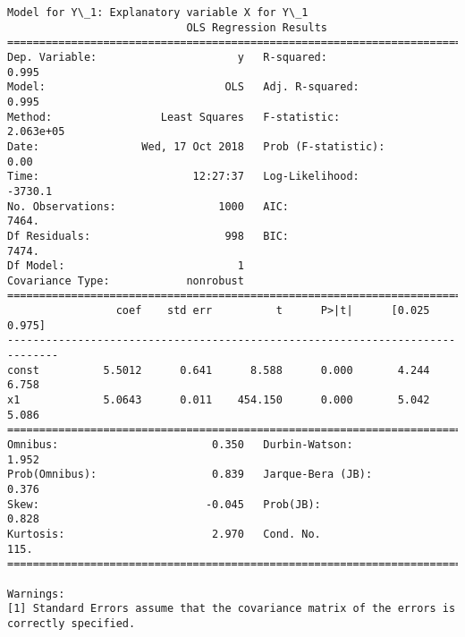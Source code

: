 \documentclass[11pt]{article}
\begin{document}
    \begin{Verbatim}[commandchars=\\\{\}]
Model for Y\_1: Explanatory variable X for Y\_1
                            OLS Regression Results                            
==============================================================================
Dep. Variable:                      y   R-squared:                       0.995
Model:                            OLS   Adj. R-squared:                  0.995
Method:                 Least Squares   F-statistic:                 2.063e+05
Date:                Wed, 17 Oct 2018   Prob (F-statistic):               0.00
Time:                        12:27:37   Log-Likelihood:                -3730.1
No. Observations:                1000   AIC:                             7464.
Df Residuals:                     998   BIC:                             7474.
Df Model:                           1                                         
Covariance Type:            nonrobust                                         
==============================================================================
                 coef    std err          t      P>|t|      [0.025      0.975]
------------------------------------------------------------------------------
const          5.5012      0.641      8.588      0.000       4.244       6.758
x1             5.0643      0.011    454.150      0.000       5.042       5.086
==============================================================================
Omnibus:                        0.350   Durbin-Watson:                   1.952
Prob(Omnibus):                  0.839   Jarque-Bera (JB):                0.376
Skew:                          -0.045   Prob(JB):                        0.828
Kurtosis:                       2.970   Cond. No.                         115.
==============================================================================

Warnings:
[1] Standard Errors assume that the covariance matrix of the errors is correctly specified.



\end{Verbatim}
\end{document}
